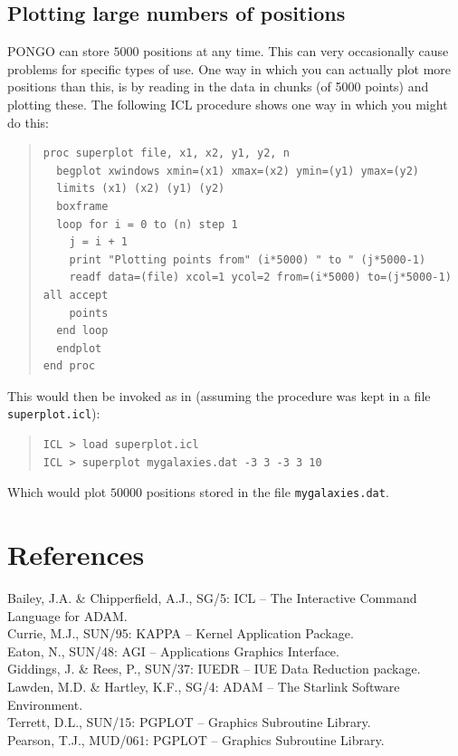 \documentclass[twoside,11pt]{article}
\newcommand{\xref}[3]{#1}
\renewcommand{\_}{\texttt{\symbol{95}}}
\begin{document}
\subsection{Plotting large numbers of positions}
PONGO can store $5000$ positions at any time. This can very
occasionally cause problems for specific types of use. One way in
which you can actually plot more positions than this, is by reading in
the data in chunks (of 5000 points) and plotting these. The following
ICL procedure shows one way in which you might do this:
\begin{quote}
\begin{verbatim}
proc superplot file, x1, x2, y1, y2, n
  begplot xwindows xmin=(x1) xmax=(x2) ymin=(y1) ymax=(y2)
  limits (x1) (x2) (y1) (y2)
  boxframe
  loop for i = 0 to (n) step 1
    j = i + 1
    print "Plotting points from" (i*5000) " to " (j*5000-1)
    readf data=(file) xcol=1 ycol=2 from=(i*5000) to=(j*5000-1) all accept
    points
  end loop
  endplot
end proc
\end{verbatim}
\end{quote}
This would then be invoked as in (assuming the procedure was kept in a
file \verb+superplot.icl+):
\begin{quote}
\begin{verbatim}
ICL > load superplot.icl
ICL > superplot mygalaxies.dat -3 3 -3 3 10
\end{verbatim}
\end{quote}
Which would plot $50000$ positions stored in the file \verb+mygalaxies.dat+.

\section{References}

\xref{Bailey, J.A. \& Chipperfield, A.J., SG/5: ICL -- The Interactive
Command Language for ADAM.}{sg5}{} \\
\xref{Currie, M.J., SUN/95: KAPPA -- Kernel Application Package.}
{sun95}{}\\
\xref{Eaton, N., SUN/48: AGI -- Applications Graphics Interface.}
{sun48}{}\\
\xref{Giddings, J. \& Rees, P., SUN/37: IUEDR -- IUE Data Reduction
package.}{sun37}{}\\
\xref{Lawden, M.D. \& Hartley, K.F., SG/4: ADAM -- The Starlink Software
Environment.}{sg4}{}\\
\xref{Terrett, D.L., SUN/15: PGPLOT -- Graphics Subroutine
Library.}{sun15}{}\\
Pearson, T.J., MUD/061: PGPLOT -- Graphics Subroutine Library.\\
\end{document}
